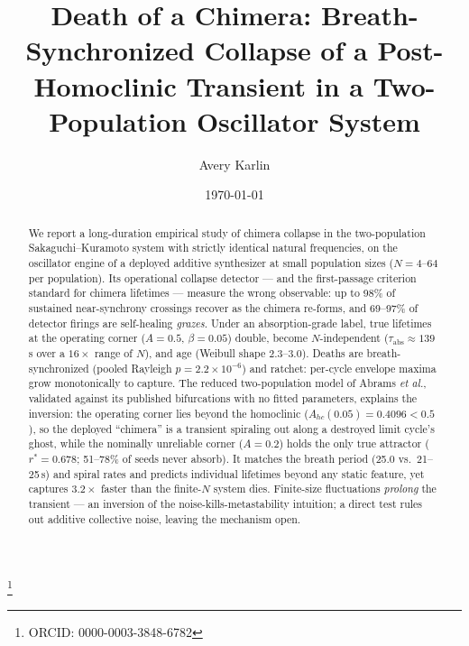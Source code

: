\documentclass[aip,preprint,amsmath,amssymb]{revtex4-2}
\begin{document}
\title[Death of a Chimera]{Death of a Chimera: Breath-Synchronized Collapse of a Post-Homoclinic Transient in a Two-Population Oscillator System}

\author{Avery Karlin}
\thanks{ORCID: 0000-0003-3848-6782}

\date{\today}

\begin{abstract}
We report a long-duration empirical study of chimera collapse in the two-population
Sakaguchi--Kuramoto system with strictly identical natural frequencies, on the
oscillator engine of a deployed additive synthesizer at small population sizes
($N = 4$--$64$ per population). Its operational collapse detector --- and the
first-passage criterion standard for chimera lifetimes --- measure the wrong
observable: up to 98\% of sustained near-synchrony crossings recover as the chimera
re-forms, and 69--97\% of detector firings are self-healing \emph{grazes}.
Under an absorption-grade label, true lifetimes at the operating corner ($A = 0.5$,
$\beta = 0.05$) double, become $N$-independent ($\tau_{\mathrm{abs}} \approx 139$\,s
over a $16\times$ range of $N$), and age (Weibull shape $2.3$--$3.0$). Deaths are
breath-synchronized (pooled Rayleigh $p = 2.2\times10^{-6}$) and ratchet: per-cycle
envelope maxima grow monotonically to capture. The reduced two-population model of
Abrams \emph{et al.}, validated against its published bifurcations with no fitted
parameters, explains the inversion: the operating corner lies beyond the homoclinic
($A_{hc}(0.05) = 0.4096 < 0.5$), so the deployed ``chimera'' is a transient
spiraling out along a destroyed limit cycle's ghost, while the nominally unreliable
corner ($A = 0.2$) holds the only true attractor ($r^* = 0.678$; 51--78\%
of seeds never absorb). It matches the breath period (25.0 vs.\ 21--25\,s) and
spiral rates and predicts individual lifetimes beyond any static feature, yet
captures $3.2\times$ faster than the finite-$N$ system dies. Finite-size
fluctuations \emph{prolong} the transient --- an inversion of the
noise-kills-metastability intuition; a direct test rules out additive collective
noise, leaving the mechanism open.
\end{abstract}

\maketitle
\end{document}
